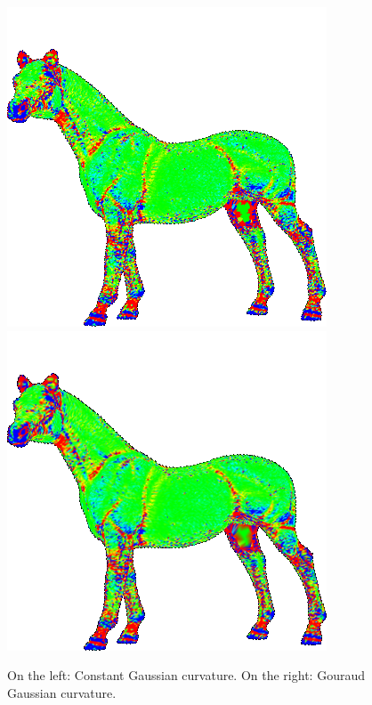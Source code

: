 \begin{figure}[!h]
    \endminipage\hfill
    \centering
    \includegraphics[scale=0.75]{images/gc-horse.png}
    \endminipage\hfill
    \centering
    \includegraphics[scale=0.75]{images/gci-horse.png}
    \endminipage
    \caption{On the left: Constant Gaussian curvature. On the right: Gouraud Gaussian curvature.}
    \label{fig:comparison-gc-gci}
\end{figure}


